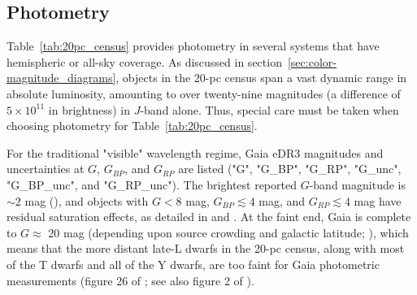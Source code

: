 \documentclass[twocolumn,tighten,twocolappendix]{aastex631}
\begin{document}
\subsection{Photometry\label{sec:photometry}}

Table~\ref{tab:20pc_census} provides photometry in several systems that have hemispheric or all-sky coverage. As discussed in section~\ref{sec:color-magnitude_diagrams}, objects in the 20-pc census span a vast dynamic range in absolute luminosity, amounting to over twenty-nine magnitudes (a difference of $5{\times}10^{11}$ in brightness) in $J$-band alone. Thus, special care must be taken when choosing photometry for Table~\ref{tab:20pc_census}.

For the traditional "visible" wavelength regime, Gaia eDR3 magnitudes and uncertainties at $G$, $G_{BP}$, and $G_{RP}$ are listed ("G", "G\_BP", "G\_RP", "G\_unc", "G\_BP\_unc", and "G\_RP\_unc"). The brightest reported $G$-band magnitude is $\sim$2 mag (\citealt{gaia2021}), and objects with $G < 8$ mag, $G_{BP} \lesssim 4$ mag, and $G_{RP} \lesssim 4$ mag have residual saturation effects, as detailed in \cite{gaia2021} and \cite{riello2021}. At the faint end, Gaia is complete to $G \approx$ 20 mag (depending upon source crowding and galactic latitude; \citealt{gaia2021}), which means that the more distant late-L dwarfs in the 20-pc census, along with most of the T dwarfs and all of the Y dwarfs, are too faint for Gaia photometric measurements (figure 26 of \citealt{smart2020}; see also figure 2 of \citealt{theissen2018}).
\end{document}
